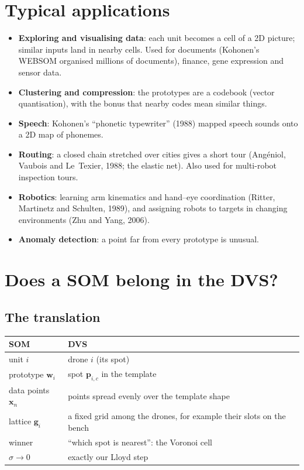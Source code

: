 \documentclass[11pt,a4paper]{article}
\newcommand{\vect}[1]{\mathbf{#1}}
\newcommand{\x}{\vect{x}}
\newcommand{\w}{\vect{w}}
\newcommand{\g}{\vect{g}}
\begin{document}
\section{Typical applications}
\begin{itemize}[leftmargin=*]
\item \textbf{Exploring and visualising data}: each unit becomes a cell of a 2D picture; similar inputs land in nearby
cells. Used for documents (Kohonen's WEBSOM organised millions of documents), finance, gene expression and sensor
data.
\item \textbf{Clustering and compression}: the prototypes are a codebook (vector quantisation), with the bonus that
nearby codes mean similar things.
\item \textbf{Speech}: Kohonen's ``phonetic typewriter'' (1988) mapped speech sounds onto a 2D map of phonemes.
\item \textbf{Routing}: a closed chain stretched over cities gives a short tour (Angéniol, Vaubois and Le~Texier,
1988; the elastic net). Also used for multi-robot inspection tours.
\item \textbf{Robotics}: learning arm kinematics and hand--eye coordination (Ritter, Martinetz and Schulten, 1989),
and assigning robots to targets in changing environments (Zhu and Yang, 2006).
\item \textbf{Anomaly detection}: a point far from every prototype is unusual.
\end{itemize}

\section{Does a SOM belong in the DVS?}

\subsection{The translation}
\begin{center}\small
\begin{tabular}{@{}p{4.2cm}p{10.4cm}@{}}
\toprule
SOM & DVS\\
\midrule
unit $i$ & drone $i$ (its spot)\\
prototype $\w_i$ & spot $\vect{p}_{i,c}$ in the template\\
data points $\x_n$ & points spread evenly over the template shape\\
lattice $\g_i$ & a fixed grid among the drones, for example their slots on the bench\\
winner & ``which spot is nearest'': the Voronoi cell\\
$\sigma\to0$ & exactly our Lloyd step\\
\bottomrule
\end{tabular}
\end{center}
\end{document}
